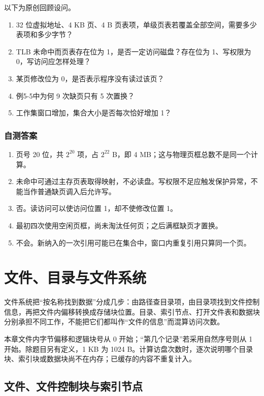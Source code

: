 以下为原创回顾设问。

\begin{enumerate}
\def\labelenumi{\arabic{enumi}.}
\tightlist
\item
  32 位虚拟地址、4 KB 页、4 B 页表项，单级页表若覆盖全部空间，需要多少表项和多少字节？
\item
  TLB 未命中而页表存在位为 1，是否一定访问磁盘？存在位为 1、写权限为 0，写访问应怎样处理？
\item
  某页修改位为 0，是否表示程序没有读过该页？
\item
  例5-5中为何 9 次缺页只有 5 次置换？
\item
  工作集窗口增加，集合大小是否每次恰好增加 1？
\end{enumerate}

\subsection{自测答案}\label{os-c05-h365}

\begin{enumerate}
\def\labelenumi{\arabic{enumi}.}
\tightlist
\item
  页号 20 位，共 \(2^{20}\) 项，占 \(2^{22}\) B，即 4 MB；这与物理页框总数不是同一个计算。
\item
  未命中可通过主存页表取得映射，不必读盘。写权限不足应触发保护异常，不能当作普通缺页调入后允许写。
\item
  否。读访问可以使访问位置 1，却不使修改位置 1。
\item
  最初四次使用空闲页框，尚未淘汰任何页；之后满框缺页才置换。
\item
  不会。新纳入的一次引用可能已在集合中，窗口内重复引用只算同一个页。
\end{enumerate}

\chapter{文件、目录与文件系统}\label{os-ch6}

文件系统把``按名称找到数据''分成几步：由路径查目录项，由目录项找到文件控制信息，再把文件内偏移转换成存储块位置。目录、索引节点、打开文件表和数据块分别承担不同工作，不能把它们都叫作``文件的信息''而混算访问次数。

本章文件内字节偏移和逻辑块号从 0 开始；``第几个记录''若采用自然序号则从 1 开始。除题目另有定义，1 KB 为 1024 B。计算访盘次数时，逐次说明哪个目录块、索引块或数据块尚不在内存；已缓存的内容不重复计入。

\section{文件、文件控制块与索引节点}\label{os-6-1}

